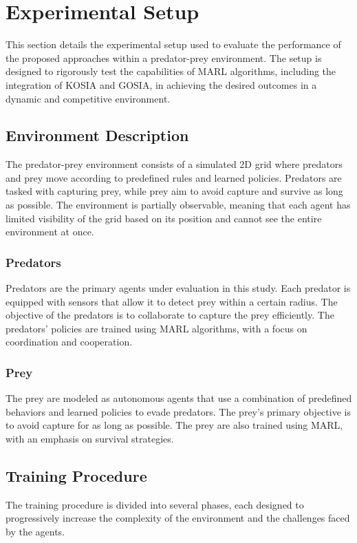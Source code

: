 \documentclass[sn-mathphys-num]{sn-jnl}%
\theoremstyle{thmstyleone}%
\theoremstyle{thmstyletwo}%
\theoremstyle{thmstylethree}%
\begin{document}
\section{Experimental Setup}\label{sec:experiment}

This section details the experimental setup used to evaluate the performance of the proposed approaches within a predator-prey environment. The setup is designed to rigorously test the capabilities of MARL algorithms, including the integration of KOSIA and GOSIA, in achieving the desired outcomes in a dynamic and competitive environment.

\subsection{Environment Description}
The predator-prey environment consists of a simulated 2D grid where predators and prey move according to predefined rules and learned policies. Predators are tasked with capturing prey, while prey aim to avoid capture and survive as long as possible. The environment is partially observable, meaning that each agent has limited visibility of the grid based on its position and cannot see the entire environment at once.

\subsubsection{Predators}
Predators are the primary agents under evaluation in this study. Each predator is equipped with sensors that allow it to detect prey within a certain radius. The objective of the predators is to collaborate to capture the prey efficiently. The predators' policies are trained using MARL algorithms, with a focus on coordination and cooperation.

\subsubsection{Prey}
The prey are modeled as autonomous agents that use a combination of predefined behaviors and learned policies to evade predators. The prey's primary objective is to avoid capture for as long as possible. The prey are also trained using MARL, with an emphasis on survival strategies.

\subsection{Training Procedure}
The training procedure is divided into several phases, each designed to progressively increase the complexity of the environment and the challenges faced by the agents.
\end{document}
